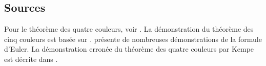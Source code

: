 \subsection*{Sources}

Pour le théorème des quatre couleurs, voir \cite{thomas,wiki:four}. La démonstration du théorème des cinq couleurs est basée sur \cite{thebook,wiki:five}.
\cite{eppstein} présente de nombreuses démonstrations de la formule d'Euler. La démonstration erronée du théorème des quatre couleurs par Kempe est décrite dans \cite{sipka}.
